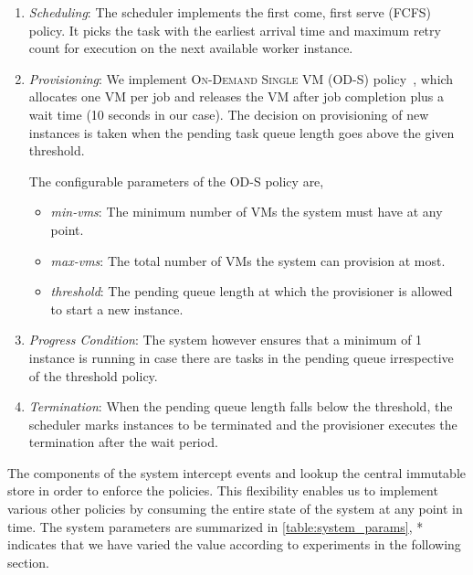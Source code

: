 \documentclass[a4paper]{IEEEtran}
\begin{document}
\begin{enumerate}
  \item \emph{Scheduling}: The scheduler implements the first come, first serve (FCFS) policy.
  It picks the task with the earliest arrival time and maximum retry count for execution on the next available worker instance.

  \item \emph{Provisioning}: We implement \textsc{On-Demand Single VM (OD-S)} policy~\cite{villegas2012analysis}, which allocates 
  one VM per job and releases the VM after job completion plus a wait time (10 seconds in our case). The decision on provisioning
  of new instances is taken when the pending task queue length goes above the given threshold.

  The configurable parameters of the OD-S policy are,
    \begin{itemize}
      \item \emph{min-vms}: The minimum number of VMs the system must have at any point.
      \item \emph{max-vms}: The total number of VMs the system can provision at most.
      \item \emph{threshold}: The pending queue length at which the provisioner is allowed to start a new instance. 
    \end{itemize} 

  \item \emph{Progress Condition}: The system however ensures that a minimum of 1 instance is running in case there are 
  tasks in the pending queue irrespective of the threshold policy. 

  \item \emph{Termination}: When the pending queue length falls below the threshold, the scheduler marks instances to be
  terminated and the provisioner executes the termination after the wait period.
\end{enumerate}

The components of the system intercept events and lookup the central immutable store in order to enforce the policies. 
This flexibility enables us to implement various other policies by consuming the entire state of the 
system at any point in time. The system parameters are summarized in \autoref{table:system_params}, * indicates that we have varied the value according to experiments in the following section.
\end{document}
